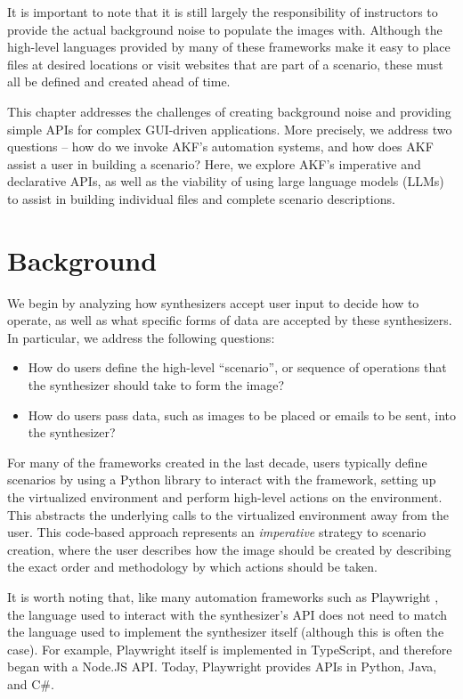 \documentclass[letterpaper,12pt]{report}
\def\tightlist{}
\begin{document}
It is important to note that it is still largely the responsibility of
instructors to provide the actual background noise to populate the
images with. Although the high-level languages provided by many of these
frameworks make it easy to place files at desired locations or visit
websites that are part of a scenario, these must all be defined and
created ahead of time.

This chapter addresses the challenges of creating background noise and
providing simple APIs for complex GUI-driven applications. More
precisely, we address two questions -- how do we invoke AKF's automation
systems, and how does AKF assist a user in building a scenario? Here, we
explore AKF's imperative and declarative APIs, as well as the viability
of using large language models (LLMs) to assist in building individual
files and complete scenario descriptions.

\section{Background}\label{background}

We begin by analyzing how synthesizers accept user input to decide how
to operate, as well as what specific forms of data are accepted by these
synthesizers. In particular, we address the following questions:

\begin{itemize}
\tightlist
\item
  How do users define the high-level ``scenario'', or sequence of
  operations that the synthesizer should take to form the image?
\item
  How do users pass data, such as images to be placed or emails to be
  sent, into the synthesizer?
\end{itemize}

For many of the frameworks created in the last decade, users typically
define scenarios by using a Python library to interact with the
framework, setting up the virtualized environment and perform high-level
actions on the environment. This abstracts the underlying calls to the
virtualized environment away from the user. This code-based approach
represents an \emph{imperative} strategy to scenario creation, where the
user describes how the image should be created by describing the exact
order and methodology by which actions should be taken.

It is worth noting that, like many automation frameworks such as
Playwright \cite{MicrosoftPlaywrightpython2025}, the language used
to interact with the synthesizer's API does not need to match the
language used to implement the synthesizer itself (although this is
often the case). For example, Playwright itself is implemented in
TypeScript, and therefore began with a Node.JS API. Today, Playwright
provides APIs in Python, Java, and C\#.
\end{document}
